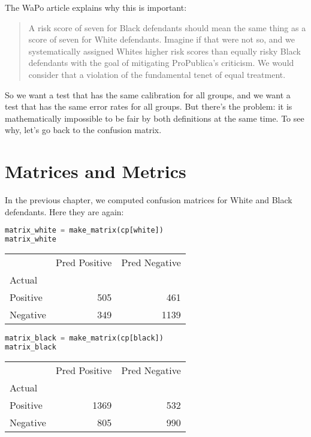 \pagebreak

The WaPo article explains why this is important:

\begin{quote}
A risk score of seven for Black defendants should mean the same thing as
a score of seven for White defendants. Imagine if that were not so, and
we systematically assigned Whites higher risk scores than equally risky
Black defendants with the goal of mitigating ProPublica's criticism. We
would consider that a violation of the fundamental tenet of equal
treatment.
\end{quote}

So we want a test that has the same calibration for all groups, and we
want a test that has the same error rates for all groups. But there's
the problem: it is mathematically impossible to be fair by both
definitions at the same time. To see why, let's go back to the confusion
matrix.

\section{Matrices and Metrics}\label{matrices-and-metrics}

In the previous chapter, we computed confusion matrices for White and
Black defendants. Here they are again:

\begin{lstlisting}[language=Python,style=source]
matrix_white = make_matrix(cp[white])
matrix_white
\end{lstlisting}

\begin{tabular}{lrr}
\toprule
 & Pred Positive & Pred Negative \\
Actual &  &  \\
\midrule
Positive & 505 & 461 \\
Negative & 349 & 1139 \\
\bottomrule
\end{tabular}

\begin{lstlisting}[language=Python,style=source]
matrix_black = make_matrix(cp[black])
matrix_black
\end{lstlisting}

\begin{tabular}{lrr}
\toprule
 & Pred Positive & Pred Negative \\
Actual &  &  \\
\midrule
Positive & 1369 & 532 \\
Negative & 805 & 990 \\
\bottomrule
\end{tabular}

